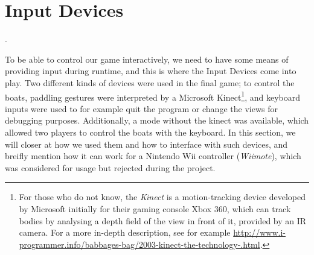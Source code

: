 \section{Input Devices}
.

To be able to control our game interactively, we need to have some means of providing input during runtime, and this is where the Input Devices come into play. Two different kinds of devices were used in the final game; to control the boats, paddling gestures were interpreted by a Microsoft Kinect\footnote{For those who do not know, the \emph{Kinect} is a motion-tracking device developed by Microsoft initially for their gaming console Xbox 360, which can track bodies by analysing a depth field of the view in front of it, provided by an IR camera. For a more in-depth description, see for example \url{http://www.i-programmer.info/babbages-bag/2003-kinect-the-technology-.html}.}, and keyboard inputs were used to for example quit the program or change the views for debugging purposes. Additionally, a mode without the kinect was available, which allowed two players to control the boats with the keyboard. In this section, we will closer at how we used them and how to interface with such devices, and breifly mention how it can work for a Nintendo Wii controller (\emph{Wiimote}), which was considered for usage but rejected during the project.

